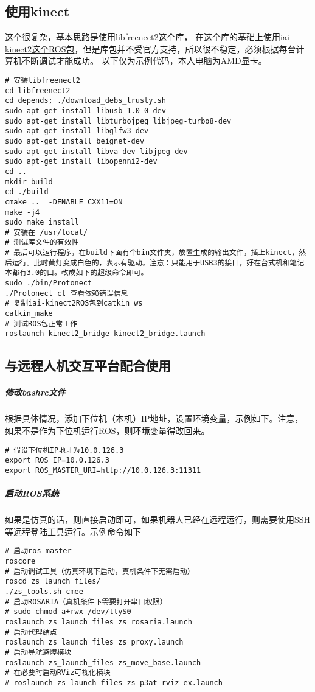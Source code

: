 \documentclass[a4paper,twoside,cs4size,fancyhdr,notitlepage]{ctexart}
\begin{document}
\subsection{使用kinect}
这个很复杂，基本思路是使用\href{https://github.com/OpenKinect/libfreenect2}{libfreenect2这个库}，
在这个库的基础上使用\href{https://github.com/code-iai/iai_kinect2}{iai-kinect2这个ROS包}，但是库包并不受官方支持，所以很不稳定，必须根据每台计算机不断调试才能成功。
以下仅为示例代码，本人电脑为AMD显卡。
\begin{lstlisting}
# 安装libfreenect2
cd libfreenect2
cd depends; ./download_debs_trusty.sh
sudo apt-get install libusb-1.0-0-dev
sudo apt-get install libturbojpeg libjpeg-turbo8-dev
sudo apt-get install libglfw3-dev
sudo apt-get install beignet-dev
sudo apt-get install libva-dev libjpeg-dev
sudo apt-get install libopenni2-dev
cd ..
mkdir build
cd ./build
cmake ..  -DENABLE_CXX11=ON
make -j4
sudo make install
# 安装在 /usr/local/
# 测试库文件的有效性
# 最后可以运行程序，在build下面有个bin文件夹，放置生成的输出文件，插上kinect，然后运行。此时黄灯变成白色的，表示有驱动。注意：只能用于USB3的接口，好在台式机和笔记本都有3.0的口。改成如下的超级命令即可。 
sudo ./bin/Protonect
./Protonect cl 查看依赖错误信息
# 复制iai-kinect2ROS包到catkin_ws
catkin_make
# 测试ROS包正常工作
roslaunch kinect2_bridge kinect2_bridge.launch
\end{lstlisting}
\subsection{与远程人机交互平台配合使用}
\label{subsec:use-with-labview}
\subparagraph{修改bashrc文件}
根据具体情况，添加下位机（本机）IP地址，设置环境变量，示例如下。注意，如果不是作为下位机运行ROS，则环境变量得改回来。
\begin{lstlisting}
# 假设下位机IP地址为10.0.126.3
export ROS_IP=10.0.126.3
export ROS_MASTER_URI=http://10.0.126.3:11311
\end{lstlisting}
\subparagraph{启动ROS系统}
如果是仿真的话，则直接启动即可，如果机器人已经在远程运行，则需要使用SSH等远程登陆工具运行。示例命令如下
\begin{lstlisting}
# 启动ros master
roscore
# 启动调试工具（仿真环境下启动，真机条件下无需启动）
roscd zs_launch_files/
./zs_tools.sh cmee
# 启动ROSARIA（真机条件下需要打开串口权限）
# sudo chmod a+rwx /dev/ttyS0
roslaunch zs_launch_files zs_rosaria.launch
# 启动代理结点
roslaunch zs_launch_files zs_proxy.launch
# 启动导航避障模块
roslaunch zs_launch_files zs_move_base.launch
# 在必要时启动RViz可视化模块
# roslaunch zs_launch_files zs_p3at_rviz_ex.launch
\end{lstlisting}
\end{document}

